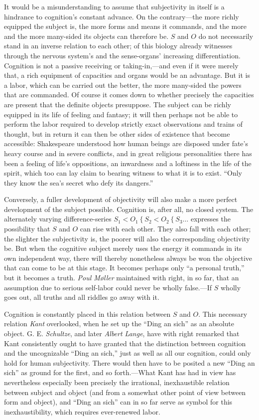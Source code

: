 \documentclass[12pt,a4paper]{book}
\newcommand{\opage}[1]{\marginnote{\footnotesize\textit{[#1]}}}
\begin{document}
It would be a misunderstanding to assume that subjectivity in itself is a hindrance to
cognition's constant advance. On the contrary---the more richly equipped the subject is, the
more forms and means it commands, and the more and the more many-sided its objects can
therefore be. $S$ and $O$ do not necessarily stand in an inverse relation to each other; of
this biology already witnesses through the nervous system's and the sense-organs' increasing
differentiation. Cognition is not a passive receiving or taking-in,---and even if it were
merely that, a rich equipment of capacities and organs would be an advantage. But it is a
labor, which can be carried out the better, the more many-sided the powers that are
commanded. Of course it comes down to whether precisely the capacities are present that the
definite objects presuppose. The subject can be richly equipped in its life of feeling and
fantasy; it will then perhaps not be able to perform the labor required to develop strictly
exact observations and trains of thought, but in return it can then be other \opage{302}sides of
existence that become accessible: Shakespeare understood how human beings are
disposed under fate's heavy course and in severe conflicts, and in great religious
personalities there has been a feeling of life's oppositions, an inwardness and a loftiness
in the life of the spirit, which too can lay claim to bearing witness to what it is to
exist. ``Only they know the sea's secret who defy its dangers.''

Conversely, a fuller development of objectivity will also make a more perfect development of
the subject possible. Cognition is, after all, no closed system. The alternately varying
difference-series $S_1 < O_1 \mathrel{\{} S_2 < O_2 \mathrel{\{} S_3 \ldots$ expresses the
possibility that $S$ and $O$ can rise with each other. They also fall with each other; the
slighter the subjectivity is, the poorer will also the corresponding objectivity be. But
when the cognitive subject merely uses the energy it commands in its own independent way,
there will thereby nonetheless always be won the objective that can come to be at this stage.
It becomes perhaps only ``a personal truth,'' but it becomes a truth. \emph{Poul Møller}
maintained with right, in so far, that an assumption due to serious self-labor could never be
wholly false.---If $S$ wholly goes out, all truths and all riddles go away with it.

Cognition is constantly placed in this relation between $S$ and $O$. This necessary relation
\emph{Kant} overlooked, when he set up the ``Ding an sich'' as an absolute object. G. E.
\emph{Schultze}, and later \emph{Albert Lange}, have with right remarked that Kant
consistently ought to have granted that the distinction between cognition and the uncognizable ``Ding an sich,'' just as well as all our cognition, could only hold for human
subjectivity. There would then have to be posited a new ``Ding an sich'' as ground for the
first, and so forth.---What Kant has had in view has nevertheless especially been precisely
the irrational, inexhaustible relation between subject and object (and from a somewhat other
point of view between form and object), and ``Ding an sich'' can in so far serve as symbol
for this inexhaustibility, which requires ever-renewed labor.
\end{document}
